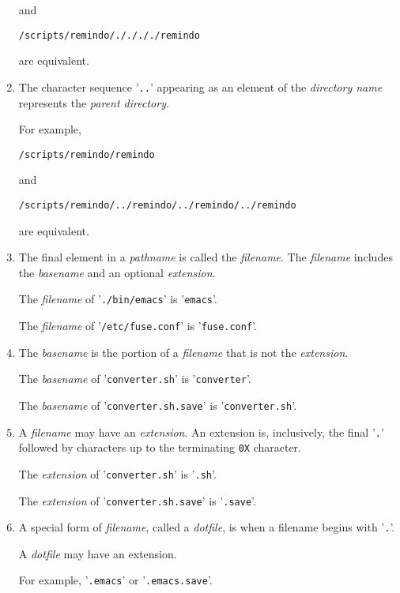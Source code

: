 \begin{enumerate}
    and

    \texttt{\TILDE/scripts/remindo/././././remindo}

    are equivalent.

  \item The character sequence '\texttt{..}' appearing as an element of
    the \emph{directory name} represents the \emph{parent directory}.

    For example,

    \texttt{\TILDE/scripts/remindo/remindo}

    and

    \texttt{\TILDE/scripts/remindo/../remindo/../remindo/../remindo}

    are equivalent.

  \item The final element in a \emph{pathname} is called the
    \emph{filename}.  The \emph{filename} includes the \emph{basename}
    and an optional \emph{extension}.

    The \emph{filename} of '\texttt{./bin/emacs}' is '\texttt{emacs}'.

    The \emph{filename} of '\texttt{/etc/fuse.conf}' is
    '\texttt{fuse.conf}'.

  \item The \emph{basename} is the portion of a \emph{filename} that
    is not the \emph{extension}.

    The \emph{basename} of '\texttt{converter.sh}' is '\texttt{converter}'.

    The \emph{basename} of '\texttt{converter.sh.save}' is '\texttt{converter.sh}'.

  \item A \emph{filename} may have an \emph{extension}.  An extension
    is, inclusively, the final '\texttt{.}' followed by \ascii
    characters up to the terminating \texttt{0X} character.

    The \emph{extension} of '\texttt{converter.sh}' is '\texttt{.sh}'.

    The \emph{extension} of '\texttt{converter.sh.save}' is '\texttt{.save}'.

  \item A special form of \emph{filename}, called a \emph{dotfile}, is
    when a filename begins with '\texttt{.}'.

    A \emph{dotfile} may have an extension.

    For example, '\texttt{.emacs}' or '\texttt{.emacs.save}'.

\end{enumerate}

